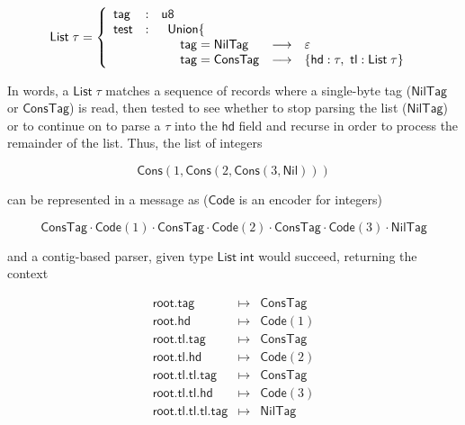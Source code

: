 \documentclass{article}
\newcommand{\konst}[1]{\ensuremath{\mathsf{#1}}}
\theoremstyle{definition}
\begin{document}
\[
 \konst{List}\;\tau =
   \left\{
     \begin{array}{lcl}
       \konst{tag} & : & \konst{u8} \\
       \konst{test} & : &
       \begin{array}[t] {lcl}
         \konst{Union} \{ \\
         \quad \konst{tag} = \konst{NilTag} & \longrightarrow & \varepsilon \\
         \quad \konst{tag} = \konst{ConsTag} & \longrightarrow &
          \{ \konst{hd} : \tau, \ \konst{tl} : \konst{List}\; \tau \}
        \end{array}
     \end{array}
   \right.
\]

In words, a $\konst{List}\;\tau$ matches a sequence of records where
a single-byte tag (\konst{NilTag} or \konst{ConsTag}) is read, then tested to see
whether to stop parsing the list (\konst{NilTag}) or to continue on to
parse a $\tau$ into the \konst{hd} field and recurse in order to
process the remainder of the list. Thus, the list of integers

\[ \konst{Cons}(1, \konst{Cons}(2, \konst{Cons}(3, \konst{Nil}))) \]

can be represented in a message as (\konst{Code} is an encoder for integers)

\[ \konst{ConsTag}\cdot \konst{Code}(1) \cdot
   \konst{ConsTag}\cdot \konst{Code}(2) \cdot
   \konst{ConsTag}\cdot \konst{Code}(3) \cdot \konst{NilTag} \]

and a contig-based parser, given type $\konst{List}\; \konst{int}$
would succeed, returning the context

\[
\begin{array}{rcl}
\konst{root.tag} & \mapsto & \konst{ConsTag} \\
\konst{root.hd} & \mapsto & \konst{Code}(1) \\
\konst{root.tl.tag} & \mapsto & \konst{ConsTag} \\
\konst{root.tl.hd} & \mapsto & \konst{Code}(2) \\
\konst{root.tl.tl.tag} & \mapsto & \konst{ConsTag} \\
\konst{root.tl.tl.hd} & \mapsto & \konst{Code}(3) \\
\konst{root.tl.tl.tl.tag} & \mapsto & \konst{NilTag}
\end{array}
\]
\end{document}

